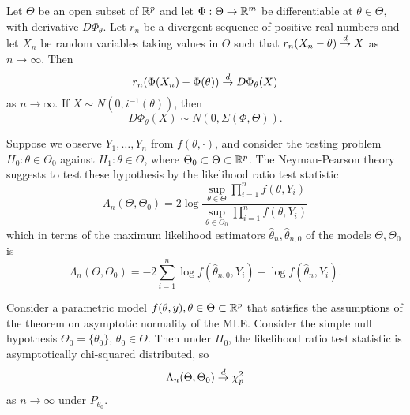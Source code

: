 \begin{thm}
  Let $\Theta$ be an open subset of $\mathbb{R}^{p}$ and let $\Phi: \Theta
  \rightarrow \mathbb{R}^{m}$ be differentiable at $\theta \in \Theta$, with
  derivative $D \Phi_{\theta}$.  Let $r_{n}$ be a divergent sequence
  of positive real numbers and let $X_{n}$ be random variables taking
  values in $\Theta$ such that $r_{n}(X_{n} - \theta) \overset{d}{\rightarrow} X$ as $n
  \rightarrow \infty$.  Then
  \begin{equation}
    \label{eq:8}
    r_{n}(\Phi(X_{n}) - \Phi(\theta)) \overset{d}{\rightarrow} D \Phi_{\theta}(X)
  \end{equation} as $n \rightarrow \infty$.  If $X \sim N(0,
  i^{-1}(\theta))$, then
  \begin{equation}
    \label{eq:20}
    D \Phi_{\theta}(X) \sim N(0, \Sigma(\Phi, \Theta)).
  \end{equation}
\end{thm}

\begin{defn}
  \label{sec:param-test-theory-1}
  Suppose we observe $Y_{1}, \dots, Y_{n}$ from $f(\theta, \cdot)$,
  and consider the testing problem $H_{0}: \theta \in \Theta_{0}$
  against $H_{1}: \theta \in \Theta$, where $\Theta_{0} \subset \Theta
  \subset \mathbb{R}^{p}$. The Neyman-Pearson theory suggests to test these
  hypothesis by the likelihood ratio test statistic
  \begin{equation}
    \label{eq:22}
    \Lambda_{n}(\Theta, \Theta_{0}) = 2 \log \frac{\sup_{\theta \in
        \Theta} \prod_{i=1}^{n} f(\theta, Y_{i})}{\sup_{\theta \in
        \Theta_{0}} \prod_{i=1}^{n} f(\theta, Y_{i})}
  \end{equation} which in terms of the maximum likelihood estimators
  $\hat \theta_{n}, \hat \theta_{n, 0}$ of the models $\Theta,
  \Theta_{0}$ is
  \begin{equation}
    \label{eq:23}
    \Lambda_{n}(\Theta, \Theta_{0}) = -2 \sum_{i=1}^{n} \log f(\hat
    \theta_{n, 0}, Y_{i}) - \log f(\hat \theta_{n}, Y_{i}).
  \end{equation}
\end{defn}

\begin{thm}
  Consider a parametric model $f(\theta, y), \theta \in \Theta \subset
  \mathbb{R}^{p}$ that satisfies the assumptions of the theorem on asymptotic
  normality of the MLE.  Consider the simple null hypothesis
  $\Theta_{0} = \{ \theta_{0} \} $, $\theta_{0} \in \Theta$.  Then
  under $H_{0}$, the likelihood ratio test statistic is asymptotically
  chi-squared distributed, so
  \begin{equation}
    \label{eq:24}
    \Lambda_{n}(\Theta, \Theta_{0}) \overset{d}{\rightarrow} \chi_{p}^{2}
  \end{equation} as $n \rightarrow \infty$ under $P_{\theta_{0}}$.
\end{thm}

